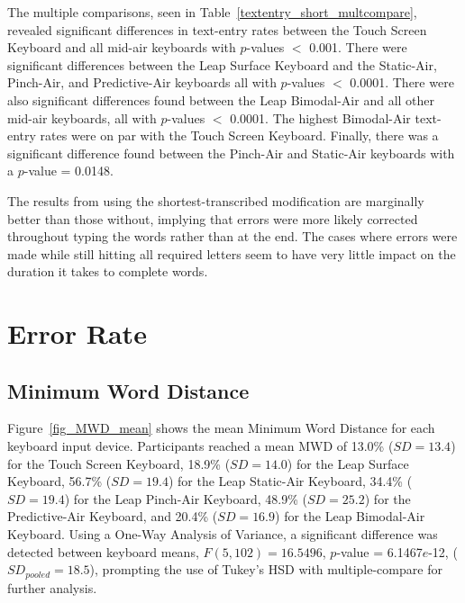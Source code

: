 The multiple comparisons, seen in Table~\ref{textentry_short_multcompare}, revealed significant differences in text-entry rates between the Touch Screen Keyboard and all mid-air keyboards with $p$-values $<$ 0.001. There were significant differences between the Leap Surface Keyboard and the Static-Air, Pinch-Air, and Predictive-Air keyboards all with $p$-values $<$ 0.0001. There were also significant differences found between the Leap Bimodal-Air and all other mid-air keyboards, all with $p$-values $<$ 0.0001. The highest Bimodal-Air text-entry rates were on par with the Touch Screen Keyboard. Finally, there was a significant difference found between the Pinch-Air and Static-Air keyboards with a $p$-value = 0.0148.

The results from using the shortest-transcribed modification are marginally better than those without, implying that errors were more likely corrected throughout typing the words rather than at the end. The cases where errors were made while still hitting all required letters seem to have very little impact on the duration it takes to complete words.

\section{Error Rate}

\subsection{Minimum Word Distance}
Figure~\ref{fig_MWD_mean} shows the mean Minimum Word Distance for each keyboard input device. Participants reached a mean MWD of 13.0\% ($SD = 13.4$) for the Touch Screen Keyboard, 18.9\% ($SD = 14.0$) for the Leap Surface Keyboard, 56.7\% ($SD = 19.4$) for the Leap Static-Air Keyboard, 34.4\% ($SD = 19.4$) for the Leap Pinch-Air Keyboard, 48.9\% ($SD = 25.2$) for the Predictive-Air Keyboard, and 20.4\% ($SD = 16.9$) for the Leap Bimodal-Air Keyboard. Using a One-Way Analysis of Variance, a significant difference was detected between keyboard means, $F(5, 102) = 16.5496$, $p$-value = 6.1467$e$-12, ($SD_{pooled} = 18.5$), prompting the use of Tukey's HSD with multiple-compare for further analysis.

